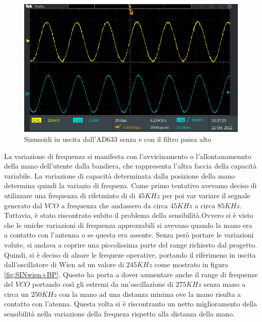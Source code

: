 \documentclass[titlepage]{report}
\begin{document}
	 \begin{figure}[H]
		\centering
		\includegraphics[scale = 0.5]{Immagini/sin_ad633+lp4_ad633+lp4+hp1.PNG}
		\caption{Sinusoidi in uscita dall'AD633 senza e con il filtro passa alto}
		\label{fig:AD33+LPconsenzaHP}
	\end{figure}


	La variazione di frequenza si manifesta con l'avvicinamento o l'allontanamennto della mano dell'utente dalla bandiera, che rappresenta l'altra faccia della capacità variabile. La variazione di capacità determinata dalla posizione della mano determina quindi la variazio di frequeza. Come primo tentativo avevamo deciso di utilizzare una frequenza di rifetminto di di $45KHz$ per poi var variare il segnale generato dal $VCO$ a frequenza che andassero da circa $45KHz$ a circa $85KHz$.
	Tuttavia, è stato riscontrato subito il problema della sensibilità.Ovvero si è visto che le uniche variazioni di frequenza apprezzabili si avevano quando la mano era a contatto con l'antenna o se questa era assente. Senza però portare le variazioni volute, si andava a coprire una piccolissima parte del range richiesto dal progetto.
	Quindi, si è deciso di alzare le frequeze operative, portando il riferimeno in uscita dall'oscillatore di Wien ad un valore di $245KHz$ come mostrato in figura \ref{fig:SINwien+BP}. Questo ha porta a dover aumentare anche il range di frequenze del $VCO$ portando così gli estremi da un'oscillazione di $275KHz$ senza mano a circa un $250KHz$ con la mano ad una distanza minima ove la mano risulta a contatto con l'atenna.
	Questa volta si è riscontranto un netto miglioramento della sensibilità nella variazione della frequeza rispetto alla distanza della mano.
	
\end{document}
